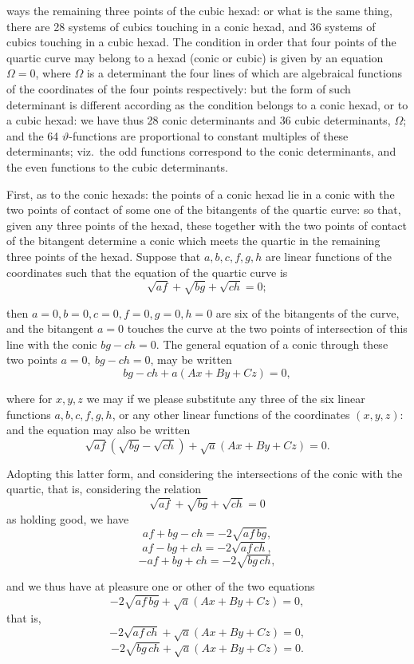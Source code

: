 \documentclass[11pt]{article}
\begin{document}
ways the remaining three points of the cubic hexad: or what is the same thing, there are 28 systems of cubics touching in a conic hexad, and 36 systems of cubics touching in a cubic hexad. The condition in order that four points of the quartic curve may belong to a hexad (conic or cubic) is given by an equation $\Omega = 0$, where $\Omega$ is a determinant the four lines of which are algebraical functions of the coordinates of the four points respectively: but the form of such determinant is different according as the condition belongs to a conic hexad, or to a cubic hexad: we have thus 28 conic determinants and 36 cubic determinants, $\Omega$; and the 64 $\vartheta$-functions are proportional to constant multiples of these determinants; viz.\ the odd functions correspond to the conic determinants, and the even functions to the cubic determinants.

\medskip

First, as to the conic hexads: the points of a conic hexad lie in a conic with the two points of contact of some one of the bitangents of the quartic curve: so that, given any three points of the hexad, these together with the two points of contact of the bitangent determine a conic which meets the quartic in the remaining three points of the hexad. Suppose that $a, b, c, f, g, h$ are linear functions of the coordinates such that the equation of the quartic curve is
\[
\sqrt{af} + \sqrt{bg} + \sqrt{ch} = 0;
\]

then $a = 0, b = 0, c = 0, f = 0, g = 0, h = 0$ are six of the bitangents of the curve, and the bitangent $a = 0$ touches the curve at the two points of intersection of this line with the conic $bg - ch = 0$. The general equation of a conic through these two points $a = 0,\ bg - ch = 0$, may be written
\[
bg - ch + a(Ax + By + Cz) = 0,
\]

where for $x, y, z$ we may if we please substitute any three of the six linear functions $a, b, c, f, g, h$, or any other linear functions of the coordinates $(x, y, z)$: and the equation may also be written
\[
\sqrt{af}(\sqrt{bg} - \sqrt{ch}) + \sqrt{a}(Ax + By + Cz) = 0.
\]

Adopting this latter form, and considering the intersections of the conic with the quartic, that is, considering the relation
\[
\sqrt{af} + \sqrt{bg} + \sqrt{ch} = 0
\]
as holding good, we have
\[
af + bg - ch = -2\sqrt{af\,bg},
\]
\[
af - bg + ch = -2\sqrt{af\,ch},
\]
\[
-af + bg + ch = -2\sqrt{bg\,ch},
\]

and we thus have at pleasure one or other of the two equations
\[
-2\sqrt{af\,bg} + \sqrt{a}(Ax + By + Cz) = 0,
\]
that is,
\[
-2\sqrt{af\,ch} + \sqrt{a}(Ax + By + Cz) = 0,
\]
\[
-2\sqrt{bg\,ch} + \sqrt{a}(Ax + By + Cz) = 0.
\]
\end{document}
